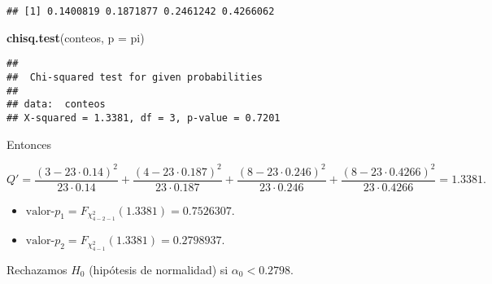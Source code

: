 \documentclass[
  12pt,
]{book}
\newenvironment{Shaded}{\begin{snugshade}}{\end{snugshade}}
\newcommand{\DataTypeTok}[1]{\textcolor[rgb]{0.13,0.29,0.53}{#1}}
\newcommand{\KeywordTok}[1]{\textcolor[rgb]{0.13,0.29,0.53}{\textbf{#1}}}
\newcommand{\NormalTok}[1]{#1}
\begin{document}
\begin{verbatim}
## [1] 0.1400819 0.1871877 0.2461242 0.4266062
\end{verbatim}

\begin{Shaded}
\begin{Highlighting}[]
\KeywordTok{chisq.test}\NormalTok{(conteos, }\DataTypeTok{p =}\NormalTok{ pi)}
\end{Highlighting}
\end{Shaded}

\begin{verbatim}
## 
##  Chi-squared test for given probabilities
## 
## data:  conteos
## X-squared = 1.3381, df = 3, p-value = 0.7201
\end{verbatim}

Entonces

\[Q' = \dfrac{(3-23\cdot 0.14)^2}{23\cdot 0.14} + \dfrac{(4-23\cdot
0.187)^2}{23\cdot 0.187} + \dfrac{(8-23\cdot 0.246)^2}{23\cdot 0.246}
+\dfrac{(8-23\cdot 0.4266)^2}{23\cdot 0.4266} = 1.3381.\]

\begin{itemize}
\item
  \(\text{valor-}p_1 = F_{\chi^2_{4-2-1}}(1.3381) = 0.7526307\).
\item
  \(\text{valor-}p_2 = F_{\chi^2_{4-1}}(1.3381) = 0.2798937\).
\end{itemize}

Rechazamos \(H_0\) (hipótesis de normalidad) si \(\alpha_0<0.2798\).
\end{document}

